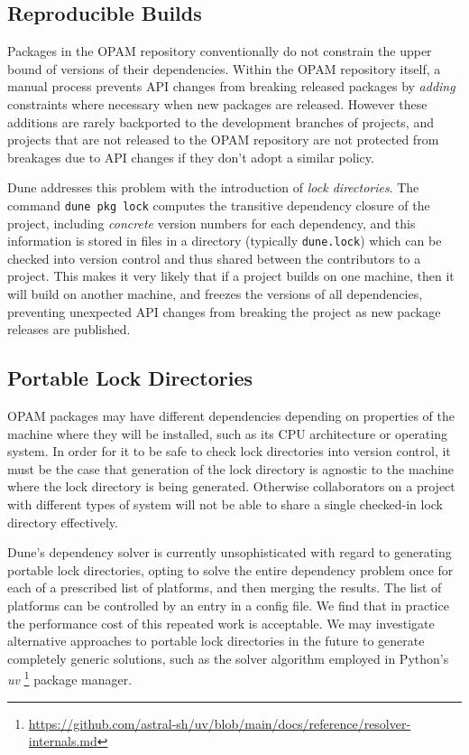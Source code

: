 \documentclass{article}
\begin{document}
\begin{multicols}{2}
        \section {Reproducible Builds}

	Packages in the OPAM repository conventionally do not constrain the
	upper bound of versions of their dependencies. Within the OPAM
	repository itself, a manual process prevents API changes from breaking
	released packages by \textit{adding} constraints where necessary when
	new packages are released. However these additions are rarely
	backported to the development branches of projects, and projects that
	are not released to the OPAM repository are not protected from
	breakages due to API changes if they don't adopt a similar policy.

        Dune addresses this problem with the introduction of \textit{lock
        directories}. The command \texttt{dune pkg lock} computes the transitive
        dependency closure of the project, including \textit{concrete} version
        numbers for each dependency, and this information is stored in files in
        a directory (typically \texttt{dune.lock}) which can be checked into
        version control and thus shared between the contributors to a project.
        This makes it very likely that if a project builds on one machine, then
        it will build on another machine, and freezes the versions of all
        dependencies, preventing unexpected API changes from breaking the
        project as new package releases are published.

        \subsection {Portable Lock Directories}

        OPAM packages may have different dependencies depending on properties of
        the machine where they will be installed, such as its CPU architecture
        or operating system. In order for it to be safe to check lock
        directories into version control, it must be the case that generation of
        the lock directory is agnostic to the machine where the lock directory
        is being generated. Otherwise collaborators on a project with different
        types of system will not be able to share a single checked-in lock
        directory effectively.

        Dune's dependency solver is currently unsophisticated with regard to
        generating portable lock directories, opting to solve the entire
        dependency problem once for each of a prescribed list of platforms, and
        then merging the results. The list of platforms can be controlled by an
        entry in a config file. We find that in practice the performance cost of
        this repeated work is acceptable. We may investigate alternative
        approaches to portable lock directories in the future to
        generate completely generic solutions, such as the solver algorithm
        employed in Python's \textit{uv}
        \footnote{\url{https://github.com/astral-sh/uv/blob/main/docs/reference/resolver-internals.md}}
        package manager.


\end{multicols}
\end{document}
